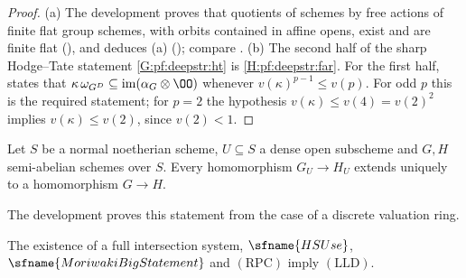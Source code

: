 \begin{proof}
(a) The development proves that quotients of schemes by free actions of finite flat group schemes, with
orbits contained in affine opens, exist and are finite flat
(), and deduces (a)
(); compare
\cite[\S12]{Mumford1970}. (b) The second half of the sharp Hodge--Tate statement \ref{G:pf:deepstr:ht} is \ref{H:pf:deepstr:far}. For the
first half,  states that
$\kappa\,\omega_{G^D}\subseteq\operatorname{im}(\alpha_G\otimes\OO)$ whenever $v(\kappa)^{p-1}\le v(p)$. For odd $p$ this is the
required statement; for $p=2$ the hypothesis $v(\kappa)\le v(4)=v(2)^2$ implies $v(\kappa)\le v(2)$, since
$v(2)<1$.
\end{proof}

\begin{littheorem}\label{lit:pf:deepstr:sah}
Let $S$ be a normal noetherian scheme, $U\subseteq S$ a dense open subscheme and $G,H$ semi-abelian schemes
over $S$. Every homomorphism $G_U\to H_U$ extends uniquely to a homomorphism $G\to H$.
\end{littheorem}

The development proves this statement from the case of a discrete valuation ring.

\begin{theorem}\label{thm:pf:deepstr:lld}
The existence of a full intersection system, $\sfname{HSUse}$, $\sfname{MoriwakiBigStatement}$ and $\mathrm{(RPC)}$
imply $\mathrm{(LLD)}$. 
\end{theorem}

